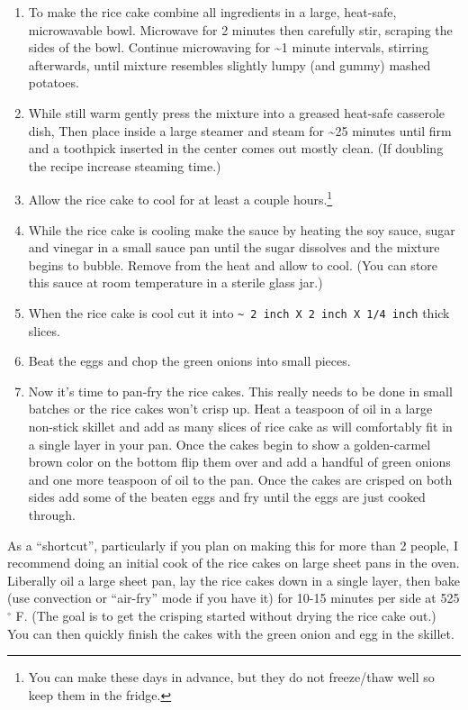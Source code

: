 \documentclass[
]{book}
\begin{document}
\begin{enumerate}
\def\labelenumi{\arabic{enumi}.}
\item
  To make the rice cake combine all ingredients in a large, heat-safe, microwavable bowl. Microwave for 2 minutes then carefully stir, scraping the sides of the bowl. Continue microwaving for \textasciitilde1 minute intervals, stirring afterwards, until mixture resembles slightly lumpy (and gummy) mashed potatoes.
\item
  While still warm gently press the mixture into a greased heat-safe casserole dish, Then place inside a large steamer and steam for \textasciitilde25 minutes until firm and a toothpick inserted in the center comes out mostly clean. (If doubling the recipe increase steaming time.)
\item
  Allow the rice cake to cool for at least a couple hours.\footnote{You can make these days in advance, but they do not freeze/thaw well so keep them in the fridge.}
\item
  While the rice cake is cooling make the sauce by heating the soy sauce, sugar and vinegar in a small sauce pan until the sugar dissolves and the mixture begins to bubble. Remove from the heat and allow to cool. (You can store this sauce at room temperature in a sterile glass jar.)
\item
  When the rice cake is cool cut it into \texttt{\textasciitilde{}\ 2\ inch\ X\ 2\ inch\ X\ 1/4\ inch} thick slices.
\item
  Beat the eggs and chop the green onions into small pieces.
\item
  Now it's time to pan-fry the rice cakes. This really needs to be done in small batches or the rice cakes won't crisp up. Heat a teaspoon of oil in a large non-stick skillet and add as many slices of rice cake as will comfortably fit in a single layer in your pan. Once the cakes begin to show a golden-carmel brown color on the bottom flip them over and add a handful of green onions and one more teaspoon of oil to the pan. Once the cakes are crisped on both sides add some of the beaten eggs and fry until the eggs are just cooked through.
\end{enumerate}

As a ``shortcut'', particularly if you plan on making this for more than 2 people, I recommend doing an initial cook of the rice cakes on large sheet pans in the oven. Liberally oil a large sheet pan, lay the rice cakes down in a single layer, then bake (use convection or ``air-fry'' mode if you have it) for 10-15 minutes per side at 525\(^\circ\) F. (The goal is to get the crisping started without drying the rice cake out.) You can then quickly finish the cakes with the green onion and egg in the skillet.
\end{document}
